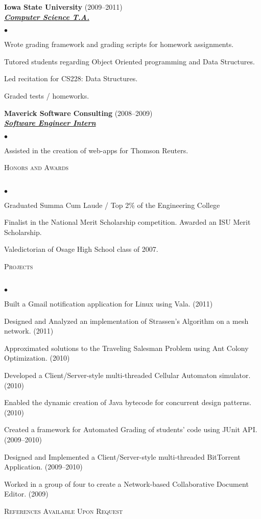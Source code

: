 \documentclass{article}
\newcommand{\lineunder} {
	\vspace*{-8pt} \\ \hspace*{-18pt} \hrulefill \\
}
\newcommand{\header}[1] {
	{\hspace*{-15pt}\vspace*{6pt} \textsc{#1}} \vspace*{-6pt} \lineunder
}
\newcommand{\employer}[3] {
	{ \textbf{#1} (#2)\\ \underline{\textbf{\emph{#3}}}\\  }
}
\newenvironment{achievements} {
	\begin{list}{$\bullet$}
		{\topsep 0pt \itemsep -2pt}
	}{
		\vspace*{4pt}\end{list}
	}
\begin{document}
	\employer{Iowa State University}{2009--2011}{Computer Science T.A.}
		\begin{achievements}
			\item{Wrote grading framework and grading scripts for homework assignments.}
			\item{Tutored students regarding Object Oriented programming and Data Structures.}
			\item{Led recitation for CS228: Data Structures.}
			\item{Graded tests / homeworks.}
		\end{achievements}

	\employer{Maverick Software Consulting}{2008--2009}{Software Engineer Intern}
		\begin{achievements}
			\item{Assisted in the creation of web-apps for Thomson Reuters.}
		\end{achievements}


\header{Honors and Awards}

	\begin{achievements}
		\item{Graduated Summa Cum Laude / Top 2\% of the Engineering College}
		\item{Finalist in the National Merit Scholarship competition. Awarded an ISU Merit Scholarship.}
		\item{Valedictorian of Osage High School class of 2007.}
	\end{achievements}

\header{Projects}

	\begin{achievements}
		\item{Built a Gmail notification application for Linux using Vala. (2011)}
		\item{Designed and Analyzed an implementation of Strassen's Algorithm on a mesh network. (2011)}
		\item{Approximated solutions to the Traveling Salesman Problem using Ant Colony Optimization. (2010)}
		\item{Developed a Client/Server-style multi-threaded Cellular Automaton simulator. (2010)}
		\item{Enabled the dynamic creation of Java bytecode for concurrent design patterns. (2010)}
		\item{Created a framework for Automated Grading of students' code using JUnit API. (2009--2010)}
		\item{Designed and Implemented a Client/Server-style multi-threaded BitTorrent Application. (2009--2010)}
		\item{Worked in a group of four to create a Network-based Collaborative Document Editor. (2009)}
	\end{achievements}

\header{References Available Upon Request}
\end{document}
